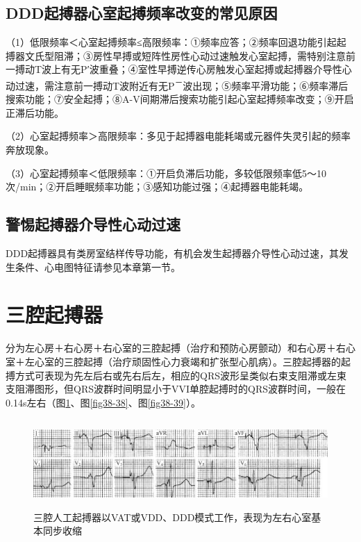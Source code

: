 \protect\hypertarget{text00045.htmlux5cux23subid500}{}{}

\subsection{DDD起搏器心室起搏频率改变的常见原因}

（1）低限频率＜心室起搏频率≤高限频率：①频率应答；②频率回退功能引起起搏器文氏型阻滞；③房性早搏或短阵性房性心动过速触发心室起搏，需特别注意前一搏动T波上有无P′波重叠；④室性早搏逆传心房触发心室起搏或起搏器介导性心动过速，需注意前一搏动T波附近有无P\textsuperscript{－}波出现；⑤频率平滑功能；⑥频率滞后搜索功能；⑦安全起搏；⑧A-V间期滞后搜索功能引起心室起搏频率改变；⑨开启正滞后功能。

（2）心室起搏频率＞高限频率：多见于起搏器电能耗竭或元器件失灵引起的频率奔放现象。

（3）心室起搏频率＜低限频率：①开启负滞后功能，多较低限频率低5～10次/min；②开启睡眠频率功能；③感知功能过强；④起搏器电能耗竭。

\protect\hypertarget{text00045.htmlux5cux23subid501}{}{}

\subsection{警惕起搏器介导性心动过速}

DDD起搏器具有类房室结样传导功能，有机会发生起搏器介导性心动过速，其发生条件、心电图特征请参见本章第一节。

\protect\hypertarget{text00045.htmlux5cux23subid502}{}{}

\section{三腔起搏器}

分为左心房＋右心房＋右心室的三腔起搏（治疗和预防心房颤动）和右心房＋右心室＋左心室的三腔起搏（治疗顽固性心力衰竭和扩张型心肌病）。三腔起搏器的起搏方式可表现为先左后右或先右后左，相应的QRS波形呈类似右束支阻滞或左束支阻滞图形，但QRS波群时间明显小于VVI单腔起搏时的QRS波群时间，一般在0.14s左右（图\ref{fig38-37}、图\ref{fig38-38}、图\ref{fig38-39}）。

\begin{figure}[!htbp]
 \centering
 \includegraphics[width=5.78125in,height=1.32292in]{./images/Image00640.jpg}
 \captionsetup{justification=centering}
 \caption{三腔人工起搏器以VAT或VDD、DDD模式工作，表现为左右心室基本同步收缩}
 \label{fig38-37}
  \end{figure} 


